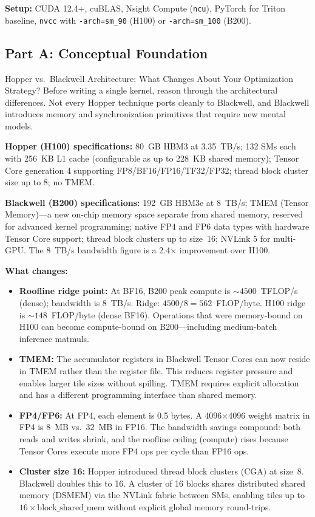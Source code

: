 \textbf{Setup:} CUDA 12.4+, cuBLAS, Nsight Compute (\texttt{ncu}), PyTorch for Triton baseline, \texttt{nvcc} with \texttt{-arch=sm\_90} (H100) or \texttt{-arch=sm\_100} (B200).

\subsection{Part A: Conceptual Foundation}

\begin{thinkfirst}{Hopper vs.\ Blackwell Architecture: What Changes About Your Optimization Strategy?}
Before writing a single kernel, reason through the architectural differences. Not every Hopper technique ports cleanly to Blackwell, and Blackwell introduces memory and synchronization primitives that require new mental models.

\textbf{Hopper (H100) specifications:} 80~GB HBM3 at 3.35~TB/s; 132 SMs each with 256~KB L1 cache (configurable as up to 228~KB shared memory); Tensor Core generation 4 supporting FP8/BF16/FP16/TF32/FP32; thread block cluster size up to 8; no TMEM.

\textbf{Blackwell (B200) specifications:} 192~GB HBM3e at 8~TB/s; TMEM (Tensor Memory)---a new on-chip memory space separate from shared memory, reserved for advanced kernel programming; native FP4 and FP6 data types with hardware Tensor Core support; thread block clusters up to size~16; NVLink 5 for multi-GPU. The 8~TB/s bandwidth figure is a 2.4$\times$ improvement over H100.

\textbf{What changes:}
\begin{itemize}
  \item \textbf{Roofline ridge point:} At BF16, B200 peak compute is $\sim 4500$~TFLOP/s (dense); bandwidth is $8$~TB/s. Ridge: $4500/8 = 562$~FLOP/byte. H100 ridge is $\sim 148$~FLOP/byte (dense BF16). Operations that were memory-bound on H100 can become compute-bound on B200---including medium-batch inference matmuls.
  \item \textbf{TMEM:} The accumulator registers in Blackwell Tensor Cores can now reside in TMEM rather than the register file. This reduces register pressure and enables larger tile sizes without spilling. TMEM requires explicit allocation and has a different programming interface than shared memory.
  \item \textbf{FP4/FP6:} At FP4, each element is 0.5 bytes. A 4096$\times$4096 weight matrix in FP4 is 8~MB vs.\ 32~MB in FP16. The bandwidth savings compound: both reads and writes shrink, and the roofline ceiling (compute) rises because Tensor Cores execute more FP4 ops per cycle than FP16 ops.
  \item \textbf{Cluster size 16:} Hopper introduced thread block clusters (CGA) at size~8. Blackwell doubles this to 16. A cluster of 16 blocks shares distributed shared memory (DSMEM) via the NVLink fabric between SMs, enabling tiles up to $16 \times \text{block\_shared\_mem}$ without explicit global memory round-trips.
\end{itemize}


\end{thinkfirst}
